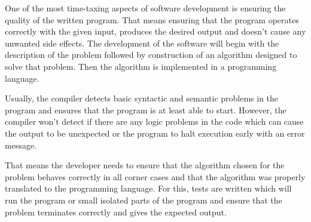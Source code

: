 \documentclass[..thesis.tex]{subfiles}
\begin{document}
One of the most time-taxing aspects of software development is ensuring the quality of the written program. 
That means ensuring that the program operates correctly with the given input, produces the desired output and doesn't cause any unwanted side effects.
The development of the software will begin with the description of the problem followed by construction of an algorithm designed to solve that problem. 
Then the algorithm is implemented in a programming language.

Usually, the compiler detects basic syntactic and semantic problems in the program and ensures that the program is at least able to start. 
However, the compiler won't detect if there are any logic problems in the code which can cause the output to be unexpected or the program to halt execution early with an error message.

That means the developer needs to ensure that the algorithm chosen for the problem behaves correctly in all corner cases and that the algorithm was properly translated to the programming language. 
For this, tests are written which will run the program or small isolated parts of the program and ensure that the problem terminates correctly and gives the expected output.
% 
% 
\end{document}
